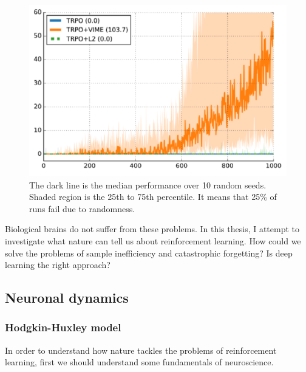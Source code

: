 \documentclass[12pt]{article}
\begin{document}
\begin{figure}[!htbp]
	\centering
	\includegraphics[width=13cm]{vime}
	\caption{The dark line is the median performance over 10 random seeds. Shaded region is the 25th to 75th percentile. It means that 25\% of runs fail due to randomness.}
	\label{fig:vime}
\end{figure} 
Biological brains do not suffer from these problems. In this thesis, I attempt to investigate what nature can tell us about reinforcement learning. How could we solve the problems of sample inefficiency and catastrophic forgetting? Is deep learning the right approach?

\subsection{Neuronal dynamics}

\subsubsection{Hodgkin-Huxley model}

In order to understand how nature tackles the problems of reinforcement learning, first we should understand some fundamentals of neuroscience. 
\end{document}
